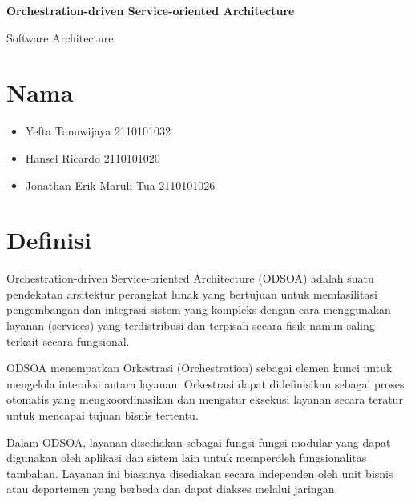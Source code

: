 \documentclass{article}
\begin{document}
	\begin{titlepage}
		\begin{center}
			\textbf{\huge Orchestration-driven Service-oriented Architecture}
			
			\vspace{0.5cm}
				
			{\large Software Architecture}
			
			\vspace{2.5cm}
			
			\section*{Nama}
			\begin{varwidth}{\textwidth}
				\begin{itemize}
					\item Yefta Tanuwijaya 2110101032
					\item Hansel Ricardo 2110101020
					\item Jonathan Erik Maruli Tua 2110101026
				\end{itemize}
			\end{varwidth}

			
			
		\end{center}

	\end{titlepage}
	\section{Definisi}
	Orchestration-driven Service-oriented Architecture (ODSOA) adalah suatu pendekatan arsitektur perangkat lunak yang bertujuan untuk memfasilitasi pengembangan dan integrasi sistem yang kompleks dengan cara menggunakan layanan (services) yang terdistribusi dan 		terpisah secara fisik namun saling terkait secara fungsional.

	ODSOA menempatkan Orkestrasi (Orchestration) sebagai elemen kunci untuk mengelola interaksi antara layanan. Orkestrasi dapat didefinisikan sebagai proses otomatis yang mengkoordinasikan dan mengatur eksekusi layanan secara teratur untuk mencapai tujuan bisnis 		tertentu.

	Dalam ODSOA, layanan disediakan sebagai fungsi-fungsi modular yang dapat digunakan oleh aplikasi dan sistem lain untuk memperoleh fungsionalitas tambahan. Layanan ini biasanya disediakan secara independen oleh unit bisnis atau departemen yang berbeda dan dapat 	diakses melalui jaringan.
\end{document}
